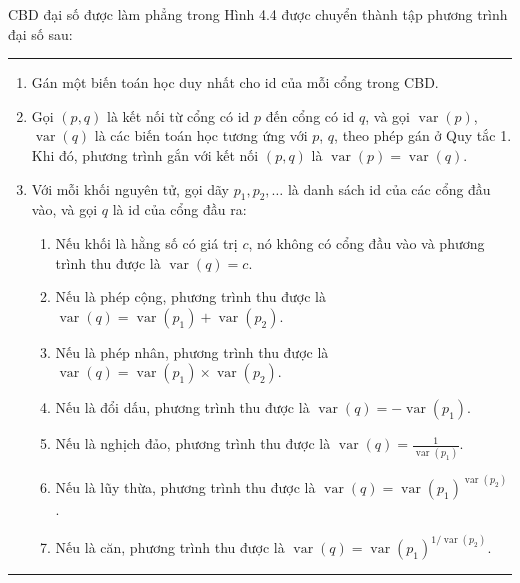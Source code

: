 CBD đại số được làm phẳng trong Hình 4.4 được chuyển thành tập phương trình đại số sau:
\begin{table}[htbp]
\caption{Ngữ nghĩa chuyển dịch của một CBD đại số được làm phẳng}
\begin{minipage}{\linewidth}\small\hrule\medskip
\begin{enumerate}
\item Gán một biến toán học duy nhất cho id của mỗi cổng trong CBD.
\item Gọi $(p,q)$ là kết nối từ cổng có id $p$ đến cổng có id $q$, và gọi $\operatorname{var}(p)$, $\operatorname{var}(q)$ là các biến toán học tương ứng với $p$, $q$, theo phép gán ở Quy tắc 1. Khi đó, phương trình gắn với kết nối $(p,q)$ là $\operatorname{var}(p)=\operatorname{var}(q)$.
\item Với mỗi khối nguyên tử, gọi dãy $p_1,p_2,\ldots$ là danh sách id của các cổng đầu vào, và gọi $q$ là id của cổng đầu ra:
\begin{enumerate}
\renewcommand{\labelenumii}{\alph{enumii}.}
\item Nếu khối là hằng số có giá trị $c$, nó không có cổng đầu vào và phương trình thu được là $\operatorname{var}(q)=c$.
\item Nếu là phép cộng, phương trình thu được là $\operatorname{var}(q)=\operatorname{var}(p_1)+\operatorname{var}(p_2)$.
\item Nếu là phép nhân, phương trình thu được là $\operatorname{var}(q)=\operatorname{var}(p_1)\times\operatorname{var}(p_2)$.
\item Nếu là đổi dấu, phương trình thu được là $\operatorname{var}(q)=-\operatorname{var}(p_1)$.
\item Nếu là nghịch đảo, phương trình thu được là $\operatorname{var}(q)=\frac{1}{\operatorname{var}(p_1)}$.
\item Nếu là lũy thừa, phương trình thu được là $\operatorname{var}(q)=\operatorname{var}(p_1)^{\operatorname{var}(p_2)}$.
\item Nếu là căn, phương trình thu được là $\operatorname{var}(q)=\operatorname{var}(p_1)^{1/\operatorname{var}(p_2)}$.
\end{enumerate}
\end{enumerate}\medskip\hrule\end{minipage}
\end{table}
